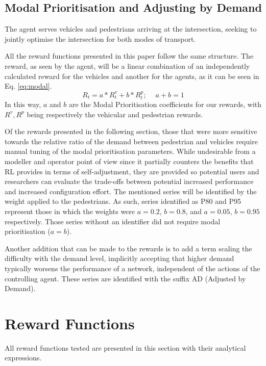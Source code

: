 \documentclass[conference]{IEEEtran}
\begin{document}
\subsection{Modal Prioritisation and Adjusting by Demand}
The agent serves vehicles and pedestrians arriving at the intersection, seeking to jointly optimise the intersection for both modes of transport.

All the reward functions presented in this paper follow the same structure.
The reward, as seen by the agent, will be a linear combination of an independently calculated reward for the vehicles and another for the agents, as it can be seen in Eq. \ref{eq:modal}.
\begin{equation}
R_t = a * R^v_t + b * R^p_t;\,\,\,\,\,\,\ a+b = 1
\label{eq:modal}
\end{equation}
In this way, $a$ and $b$ are the Modal Prioritisation coefficients for our rewards, with $R^v, R^p$ being respectively the vehicular and pedestrian rewards.

Of the rewards presented in the following section, those that were more sensitive towards the relative ratio of the demand between pedestrian and vehicles require manual tuning of the modal prioritisation parameters.
While undesirable from a modeller and operator point of view since it partially counters the benefits that RL provides in terms of self-adjustment, they are provided so potential users and researchers can evaluate the trade-offs between potential increased performance and increased configuration effort.
The mentioned series will be identified by the weight applied to the pedestrians.
As such, series identified as P80 and P95 represent those in which the weights were $a=0.2$, $b=0.8$, and $a=0.05$, $b=0.95$ respectively. 
Those series without an identifier did not require modal prioritisation ($a = b$).

Another addition that can be made to the rewards is to add a term scaling the difficulty with the demand level, implicitly accepting that higher demand typically worsens the performance of a network, independent of the actions of the controlling agent.
These series are identified with the suffix AD (Adjusted by Demand).
\section{Reward Functions}
\label{rewards}
All reward functions tested are presented in this section with their analytical expressions.
\end{document}
